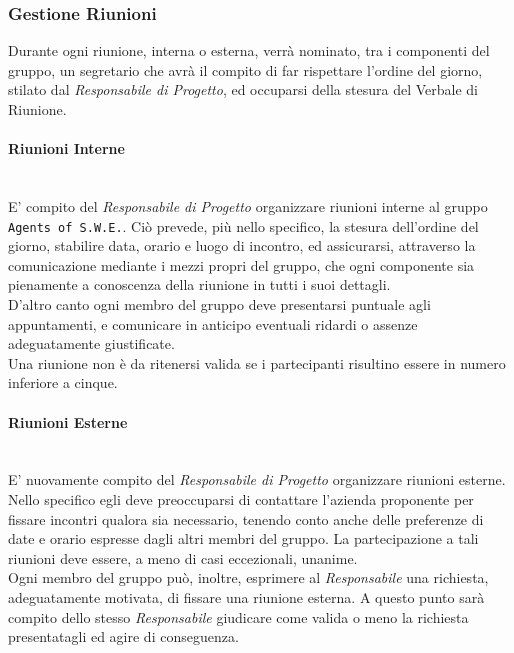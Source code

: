 \subsubsection{Gestione Riunioni}
	Durante ogni riunione, interna o esterna, verrà nominato, tra i componenti del gruppo, un segretario che avrà il 		compito di far rispettare l'ordine del giorno, stilato dal \textit{Responsabile di Progetto}, ed occuparsi della 		stesura del	Verbale di Riunione\glossario.

\paragraph{Riunioni Interne} ~\\
	E' compito del \textit{Responsabile di Progetto} organizzare riunioni interne al gruppo \texttt{Agents of 						S.W.E.}. Ciò prevede, più nello specifico, la stesura dell'ordine del giorno, stabilire data, orario e luogo di 			incontro, ed assicurarsi, attraverso la comunicazione mediante i mezzi propri del gruppo, che ogni componente sia 	pienamente a conoscenza della riunione in tutti i suoi dettagli. \\
	D'altro canto ogni membro del gruppo deve presentarsi puntuale agli appuntamenti, e comunicare in anticipo 					eventuali ridardi o assenze adeguatamente giustificate. \\
	Una riunione non è da ritenersi valida se i partecipanti risultino essere in numero inferiore a cinque.

\paragraph{Riunioni Esterne} ~\\
	E' nuovamente compito del \textit{Responsabile di Progetto} organizzare riunioni esterne. Nello specifico egli 			deve preoccuparsi di contattare l'azienda proponente per fissare incontri qualora sia necessario, tenendo conto anche delle preferenze 			di date e orario espresse dagli altri membri del gruppo. La partecipazione a tali riunioni deve essere, a meno di 	casi eccezionali, unanime.\\
	Ogni membro del gruppo può, inoltre, esprimere al \textit{Responsabile} una richiesta, adeguatamente motivata, 			di fissare una riunione esterna. A questo punto sarà compito dello stesso \textit{Responsabile} giudicare come 			valida o meno la richiesta presentatagli ed agire di conseguenza.

